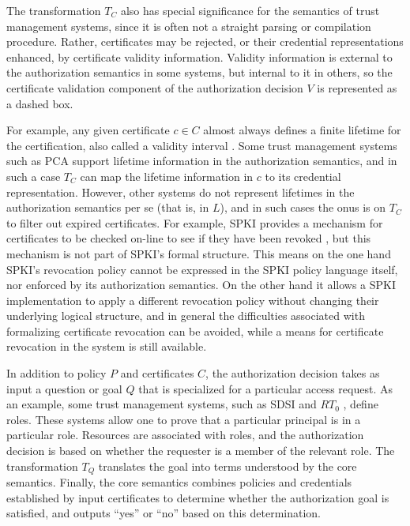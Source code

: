 The transformation $T_C$ also has special significance for the semantics of trust management
systems, since it is often not a straight parsing or compilation procedure. Rather, certificates
may be rejected, or their credential representations enhanced, by certificate validity
information. Validity information is external to the authorization semantics in some systems,
but internal to it in others, so the certificate validation component of the
authorization decision $V$ is represented as a dashed box.

For example, any given certificate $c \in C$ almost always defines a finite lifetime for the
certification, also called a validity interval \cite{winslett-adl97}. Some trust management
systems such as PCA \cite{Bauer:GFACSW} support lifetime information in the authorization
semantics, and in such a case $T_C$ can map the lifetime information in $c$ to its credential
representation. However, other systems do not represent lifetimes in the authorization semantics
per se (that is, in $L$), and in such cases the onus is on $T_C$ to filter out expired
certificates. For example, SPKI provides a mechanism for certificates to be checked on-line to
see if they have been revoked \cite{RFC-2693}, but this mechanism is not part of SPKI's formal
structure. This means on the one hand SPKI's revocation policy cannot be expressed in the SPKI
policy language itself, nor enforced by its authorization semantics. On the other hand it allows
a SPKI implementation to apply a different revocation policy without changing their underlying
logical structure, and in general the difficulties associated with formalizing certificate
revocation \cite{Stubblebine:RSAERDS,Stubblebine:ALSSRR,Rivest:CWECRL} can be avoided, while a
means for certificate revocation in the system is still available.

In addition to policy $P$ and certificates $C$, the authorization decision takes as input a
question or goal $Q$ that is specialized for a particular access request. As an example, some
trust management systems, such as SDSI and $RT_0$ \cite{Li:DRBTMF,Li:RRBTMF}, define roles.
These systems allow one to prove that a particular principal is in a particular role. Resources
are associated with roles, and the authorization decision is based on whether the requester is a
member of the relevant role. The transformation $T_Q$ translates the goal into terms understood
by the core semantics. Finally, the core semantics combines policies and credentials established
by input certificates to determine whether the authorization goal is satisfied, and outputs
``yes'' or ``no'' based on this determination.

